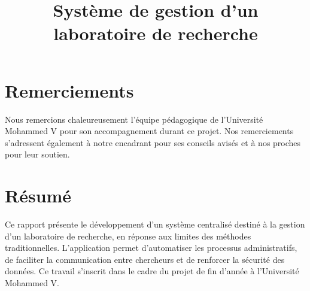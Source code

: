 \documentclass{rapportPfe}
\title{Système de gestion d'un laboratoire de recherche}
\begin{document}






\fairemarges
\fairepagedegarde


\chapter*{Remerciements}
Nous remercions chaleureusement l’équipe pédagogique de l’Université Mohammed V pour son accompagnement durant ce projet. Nos remerciements s’adressent également à notre encadrant pour ses conseils avisés et à nos proches pour leur soutien.

\chapter*{Résumé}
Ce rapport présente le développement d’un système centralisé destiné à la gestion d’un laboratoire de recherche, en réponse aux limites des méthodes traditionnelles. L’application permet d’automatiser les processus administratifs, de faciliter la communication entre chercheurs et de renforcer la sécurité des données. Ce travail s’inscrit dans le cadre du projet de fin d’année à l’Université Mohammed V.
\end{document}
